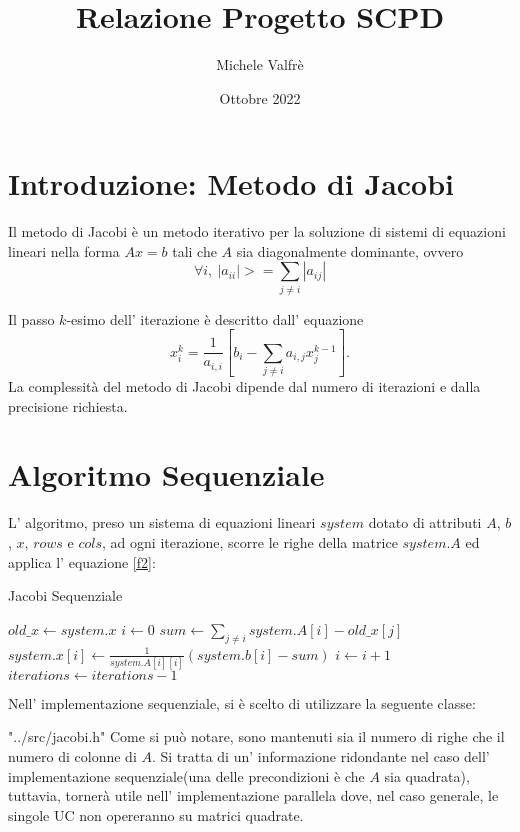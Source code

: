 \documentclass[twocolumn]{article}
\title{Relazione Progetto SCPD}
\date{Ottobre 2022}
\author{Michele Valfrè}
\begin{document}
	\maketitle
	\section{Introduzione: Metodo di Jacobi}
	Il metodo di Jacobi è un metodo iterativo per la soluzione di sistemi di equazioni lineari nella forma $Ax=b$ tali che $A$ sia diagonalmente dominante, ovvero
	\begin{equation}\label{f1}
		\forall i,\ |a_{ii}| >= \sum_{j \neq i} |a_{ij}| 
	\end{equation}
	
	Il passo $k$-esimo dell' iterazione è descritto dall' equazione
	\begin{equation}\label{f2}
		x^{k}_i = \frac{1}{a_{i,i}}[b_i  - \sum_{j\neq i}a_{i,j}x^{k-1}_j].
	\end{equation}
	La complessità del metodo di Jacobi dipende dal numero di iterazioni e dalla precisione richiesta.
	\section{Algoritmo Sequenziale}
	L' algoritmo, preso un sistema di equazioni lineari $system$ dotato di attributi $A$, $b$, $x$, $rows$ e $cols$, ad ogni iterazione, scorre le righe della matrice $system.A$  ed applica l' equazione \eqref{f2}:
	
	\begin{algorithm}
		\footnotesize
		\caption{Jacobi Sequenziale}
		\begin{algorithmic}[1]
				\State $old\_x \gets system.x$
				\State $i \gets 0$
				\State $sum \gets \sum_{j\neq i} system.A[i] - old\_x[j]$%
				\State $system.x[i] \gets \frac{1}{system.A[i][i]}(system.b[i] - sum)$
				\State $i \gets i + 1$
				\EndWhile
				\State $iterations \gets iterations - 1$
				\EndWhile
			\EndFunction
		\end{algorithmic}
	\end{algorithm}
	\pagebreak

	
	Nell' implementazione sequenziale, si è scelto di utilizzare la seguente classe:
	
	{"../src/jacobi.h"}
	Come si può notare, sono mantenuti sia il numero di righe che il numero di colonne di $A$. Si tratta di un' informazione ridondante nel caso dell' implementazione sequenziale(una delle precondizioni è che $A$ sia quadrata), tuttavia, tornerà utile nell' implementazione parallela dove, nel caso generale, le singole UC non opereranno su matrici quadrate.
	
\end{document}
